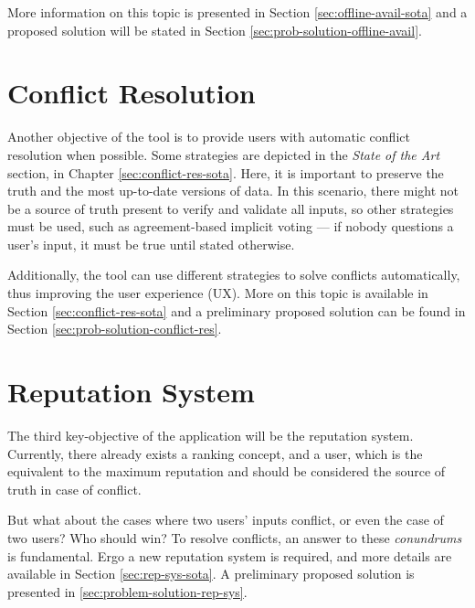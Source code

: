 More information on this topic is presented in Section \ref{sec:offline-avail-sota} and a proposed solution will be stated in Section \ref{sec:prob-solution-offline-avail}.

\section{Conflict Resolution} \label{sec:conflict-res-intro}

Another objective of the tool is to provide users with automatic conflict resolution when possible. Some strategies are depicted in the \textit{State of the Art} section, in Chapter \ref{sec:conflict-res-sota}. Here, it is important to preserve the truth and the most up-to-date versions of data. In this scenario, there might not be a source of truth present to verify and validate all inputs, so other strategies must be used, such as agreement-based implicit voting --- if nobody questions a user's input, it must be true until stated otherwise.

Additionally, the tool can use different strategies to solve conflicts automatically, thus improving the user experience (UX). More on this topic is available in Section \ref{sec:conflict-res-sota} and a preliminary proposed solution can be found in Section \ref{sec:prob-solution-conflict-res}.

\section{Reputation System} \label{sec:rep-sys-intro}

The third key-objective of the application will be the reputation system. Currently, there already exists a ranking concept, and a  user, which is the equivalent to the maximum reputation and should be considered the source of truth in case of conflict.

But what about the cases where two  users' inputs conflict, or even the case of two  users? Who should win? To resolve conflicts, an answer to these \textit{conundrums} is fundamental. Ergo a new reputation system is required, and more details are available in Section \ref{sec:rep-sys-sota}. A preliminary proposed solution is presented in \ref{sec:problem-solution-rep-sys}.
